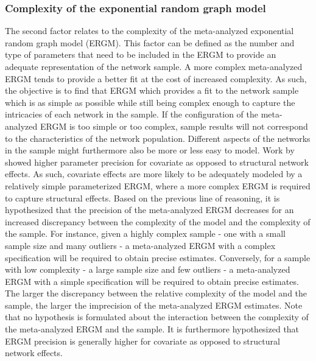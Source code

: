\documentclass[a4paper, man]{apa6}
\begin{document}
\subsubsection{Complexity of the exponential random graph model} The second factor relates to the complexity of the meta-analyzed exponential random graph model (ERGM). This factor can be defined as the number and type of parameters that need to be included in the ERGM to provide an adequate representation of the network sample. A more complex meta-analyzed ERGM tends to provide a better fit at the cost of increased complexity. As such, the objective is to find that ERGM which provides a fit to the network sample which is as simple as possible while still being complex enough to capture the intricacies of each network in the sample.  \clearpage \noindent If the configuration of the meta-analyzed ERGM is too simple or too complex, sample results will not correspond to the characteristics of the network population. Different aspects of the networks in the sample might furthermore also be more or less easy to model. Work by  showed higher parameter precision for covariate as opposed to structural network effects. As such, covariate effects are more likely to be adequately modeled by a relatively simple parameterized ERGM, where a more complex ERGM is required to capture structural effects. Based on the previous line of reasoning, it is hypothesized that the precision of the meta-analyzed ERGM decreases for an increased discrepancy between the complexity of the model and the complexity of the sample. For instance, given a highly complex sample - one with a small sample size and many outliers - a meta-analyzed ERGM with a complex specification will be required to obtain precise estimates. Conversely, for a sample with low complexity - a large sample size and few outliers - a meta-analyzed ERGM with a simple specification will be required to obtain precise estimates. The larger the discrepancy between the relative complexity of the model and the sample, the larger the imprecision of the meta-analyzed ERGM estimates. Note that no hypothesis is formulated about the interaction between the complexity of the meta-analyzed ERGM and the sample. It is furthermore hypothesized that ERGM precision is generally higher for covariate as opposed to structural network effects. 
\end{document}
